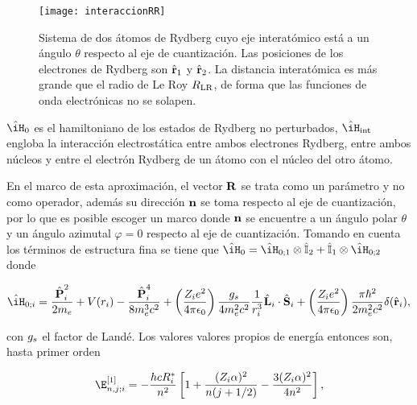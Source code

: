 \begin{figure}
\centering
\begin{minipage}[c]{0.3\textwidth}
\centering
\texttt{[image: interaccionRR]}
\end{minipage}
\hspace{5mm}
\begin{minipage}[c]{0.4\textwidth}
\centering
\caption{\label{fig:interaccionRR}Sistema de dos átomos de Rydberg cuyo eje interatómico está a un ángulo $\theta$ respecto al eje de cuantización. Las posiciones de los electrones de Rydberg son $\hat{\text{\textbf{r}}}_{1}$ y $\hat{\text{\textbf{r}}}_{2}$. La distancia interatómica es más grande que el radio de Le Roy $R_{\text{LR}}$, de forma que las funciones de onda electrónicas no se solapen.}
\end{minipage}
\end{figure}

$\hat{\iH}_\sm{0}$ es el hamiltoniano de los estados de Rydberg no perturbados, $\hat{\iH}_\sm{\text{int}}$ engloba la interacción electrostática entre ambos electrones Rydberg, entre ambos núcleos y entre el electrón Rydberg de un átomo con el núcleo del otro átomo.

\p En el marco de esta aproximación, el vector $\text{\textbf{R}}$ se trata como un parámetro y no como operador, además su dirección $\text{\textbf{n}}$ se toma respecto al eje de cuantización, por lo que es posible escoger un marco donde $\text{\textbf{n}}$ se encuentre a un ángulo polar $\theta$ y un ángulo azimutal $\varphi=0$ respecto al eje de cuantización. Tomando en cuenta los términos de estructura fina se tiene que $\hat{\iH}_\sm{0}=\hat{\iH}_\sm{0;1}\otimes\hat{\mathbb{I}}_\sm{2}+\hat{\mathbb{I}}_\sm{1}\otimes\hat{\iH}_\sm{0;2}$ donde

\begin{equation}
\label{ec:hamiltonianoNoPerturbado}
\hat{\iH}_\sm{0;i}=\frac{\hat{\vektor{P}}_\sm{i}^{2}}{2m_\sm{e}}+V(r_\sm{i})-\frac{\hat{\vektor{P}}_\sm{i}^{4}}{8m_\sm{e}^{3}c^{2}}+\left(\frac{Z_\sm{i}e^{2}}{4\pi\epsilon_\sm{0}}\right)\frac{g_\sm{s}}{4m_\sm{e}^{2}c^{2}}\frac{1}{r_\sm{i}^{3}}\hat{\vektor{L}}_\sm{i}\cdot\hat{\vektor{S}}_\sm{i}+\left(\frac{Z_\sm{i}e^{2}}{4\pi\epsilon_\sm{0}}\right)\frac{\pi\hbar^{2}}{2m_\sm{e}^{2}c^{2}}\delta(\hat{\vektor{r}}_\sm{i}),
\end{equation}

con $g_{s}$ el factor de Landé. Los valores valores propios de energía entonces son, hasta primer orden

\begin{equation}
\label{ec:energiaNoPerturnado}
\E_\sm{n,j;i}^{[1]}=-\frac{hcR_\sm{i}^{*}}{n^{2}}\left[1+\frac{(Z_\sm{i}\alpha)^{2}}{n(j+1/2)}-\frac{3(Z_\sm{i}\alpha)^{2}}{4n^{2}}\right],
\end{equation}

